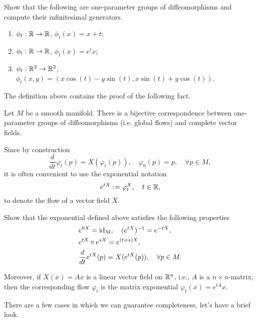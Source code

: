 \begin{exercise}
  Show that the following are one-parameter groups of diffeomorphisms and compute their infinitesimal generators.
  \begin{enumerate}
    \item $\phi_t:\mathbb{R}\to\mathbb{R}$, $\phi_t(x) = x + t$;
    \item $\phi_t:\mathbb{R}\to\mathbb{R}$, $\phi_t(x) = e^t x$;
    \item $\phi_t:\mathbb{R}^2\to\mathbb{R}^2$, $\phi_t(x,y) = (x\cos(t) - y\sin(t), x\sin(t)+y\cos(t))$.
  \end{enumerate}
\end{exercise}

The definition above contains the proof of the following fact.
\begin{proposition}
  Let $M$ be a smooth manifold. There is a bijective correspondence between one-parameter groups of diffeomorphisms (i.e. global flows) and complete vector fields.
\end{proposition}

\begin{notation}
  Since by construction
  \begin{equation}
    \frac{d}{d t}\varphi_t(p) = X(\varphi_t(p)), \quad
    \varphi_0(p) = p, \quad \forall p\in M,
  \end{equation}
  it is often convenient to use the exponential notation
  \begin{equation}
    e^{t X} := \varphi^X_t, \quad t\in\mathbb{R},
  \end{equation}
  to denote the flow of a vector field $X$.
\end{notation}

\begin{exercise}
  Show that the exponential defined above satisfies the following properties
  \begin{align}
    &e^{0X} = \operatorname{id}_M, \quad (e^{tX})^{-1} = e^{-tX}, \\
    &e^{t X}\circ e^{s X}= e^{(t+s)X},\\
    &\frac{d}{d t} e^{tX} (p) = X(e^{tX}(p)), \quad \forall p\in M.
  \end{align}

  Moreover, if $X(x) = Ax$ is a linear vector field on $\mathbb{R}^n$, i.e., $A$ is a $n\times n$-matrix, then the corresponding flow $\varphi_t$ is the matrix exponential $\varphi_t(x) = e^{tA}x$.
\end{exercise}

There are a few cases in which we can guarantee completeness, let's have a brief look.

